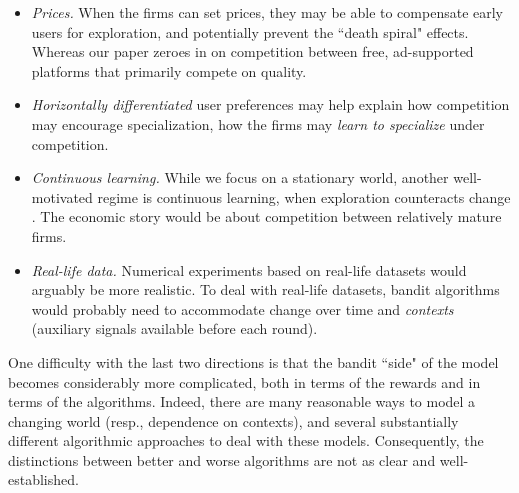 \documentclass[../competing_bandits.tex]{subfiles}
\begin{document}
\begin{itemize}

\item \emph{Prices.}
When the firms can set prices, they may be able to compensate early users for exploration, and potentially prevent the ``death spiral" effects. Whereas our paper zeroes in on competition between free, ad-supported platforms that primarily compete on quality.

\item 
\emph{Horizontally differentiated} user preferences may help explain how competition may encourage specialization, \ie how the firms may \emph{learn to specialize} under competition.


\item \emph{Continuous learning.}
While we focus on a stationary world, another well-motivated regime is continuous learning, when exploration counteracts change
\citep{DynamicMAB-colt08}.
The economic story would be about competition between relatively mature firms.

\item \emph{Real-life data.}
Numerical experiments based on real-life datasets would arguably be more realistic. To deal with real-life datasets, bandit algorithms would probably need to accommodate change over time and \emph{contexts} (auxiliary signals available before each round).

\end{itemize}

\noindent One difficulty with the last two directions is that the bandit ``side" of the model becomes considerably more complicated, both in terms of the rewards and in terms of the algorithms. Indeed, there are many reasonable ways to model a changing world (resp., dependence on  contexts), and several substantially different algorithmic approaches to deal with these models. Consequently, the distinctions between better and worse algorithms are not as clear and well-established.
\end{document}
